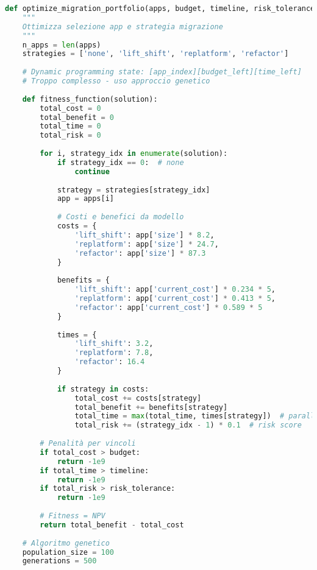 \begin{lstlisting}[language=Python, caption=Ottimizzazione portfolio migrazione]
def optimize_migration_portfolio(apps, budget, timeline, risk_tolerance):
    """
    Ottimizza selezione app e strategia migrazione
    """
    n_apps = len(apps)
    strategies = ['none', 'lift_shift', 'replatform', 'refactor']
    
    # Dynamic programming state: [app_index][budget_left][time_left]
    # Troppo complesso - uso approccio genetico
    
    def fitness_function(solution):
        total_cost = 0
        total_benefit = 0
        total_time = 0
        total_risk = 0
        
        for i, strategy_idx in enumerate(solution):
            if strategy_idx == 0:  # none
                continue
                
            strategy = strategies[strategy_idx]
            app = apps[i]
            
            # Costi e benefici da modello
            costs = {
                'lift_shift': app['size'] * 8.2,
                'replatform': app['size'] * 24.7,
                'refactor': app['size'] * 87.3
            }
            
            benefits = {
                'lift_shift': app['current_cost'] * 0.234 * 5,
                'replatform': app['current_cost'] * 0.413 * 5,
                'refactor': app['current_cost'] * 0.589 * 5
            }
            
            times = {
                'lift_shift': 3.2,
                'replatform': 7.8,
                'refactor': 16.4
            }
            
            if strategy in costs:
                total_cost += costs[strategy]
                total_benefit += benefits[strategy]
                total_time = max(total_time, times[strategy])  # parallelizzabile
                total_risk += (strategy_idx - 1) * 0.1  # risk score
                
        # Penalità per vincoli
        if total_cost > budget:
            return -1e9
        if total_time > timeline:
            return -1e9
        if total_risk > risk_tolerance:
            return -1e9
            
        # Fitness = NPV
        return total_benefit - total_cost
    
    # Algoritmo genetico
    population_size = 100
    generations = 500
    

\end{lstlisting}
